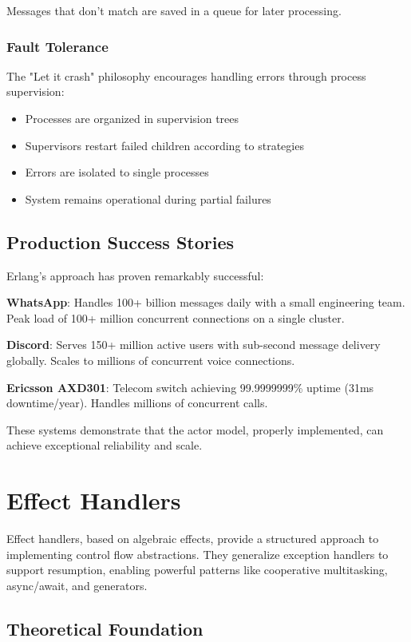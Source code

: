 \documentclass[12pt,a4paper]{report}
\begin{document}
Messages that don't match are saved in a queue for later processing.

\subsubsection{Fault Tolerance}
The "Let it crash" philosophy encourages handling errors through process supervision:
\begin{itemize}
\item Processes are organized in supervision trees
\item Supervisors restart failed children according to strategies
\item Errors are isolated to single processes
\item System remains operational during partial failures
\end{itemize}

\subsection{Production Success Stories}

Erlang's approach has proven remarkably successful:

\textbf{WhatsApp}: Handles 100+ billion messages daily with a small engineering team. Peak load of 100+ million concurrent connections on a single cluster.

\textbf{Discord}: Serves 150+ million active users with sub-second message delivery globally. Scales to millions of concurrent voice connections.

\textbf{Ericsson AXD301}: Telecom switch achieving 99.9999999\% uptime (31ms downtime/year). Handles millions of concurrent calls.

These systems demonstrate that the actor model, properly implemented, can achieve exceptional reliability and scale.

\section{Effect Handlers}

Effect handlers, based on algebraic effects, provide a structured approach to implementing control flow abstractions. They generalize exception handlers to support resumption, enabling powerful patterns like cooperative multitasking, async/await, and generators.

\subsection{Theoretical Foundation}
\end{document}
